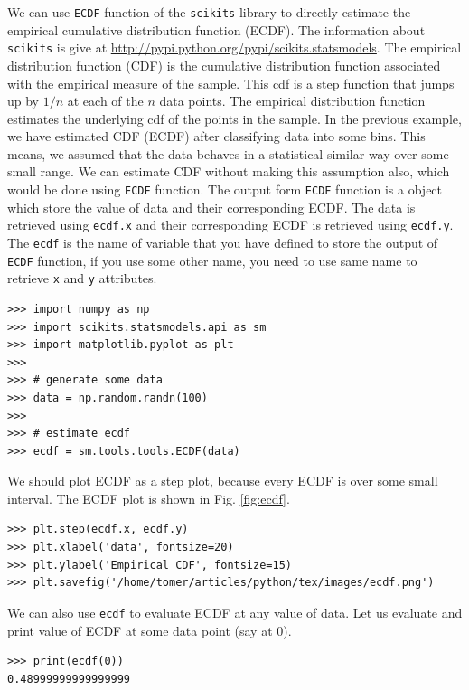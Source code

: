 \documentclass[10pt]{book}
\begin{document}
{We can use \verb"ECDF" function of the \verb"scikits" library to directly estimate the empirical cumulative distribution function (ECDF). The information about \verb"scikits" is give at \url{http://pypi.python.org/pypi/scikits.statsmodels}. The empirical distribution function (CDF) is the cumulative distribution function associated with the empirical measure of the sample. This cdf is a step function that jumps up by $1/n$ at each of the $n$ data points. The empirical distribution function estimates the underlying cdf of the points in the sample. In the previous example, we have estimated CDF (ECDF) after classifying data into some bins. This means, we assumed that the data behaves in a statistical similar way over some small range. We can estimate CDF without making this assumption also, which would be done using \verb"ECDF" function. The output form \verb"ECDF" function is a object which store the value of data and their corresponding ECDF. The data is retrieved using \verb"ecdf.x" and their corresponding 
ECDF is retrieved using \verb"ecdf.y". The \verb"ecdf" is the name of variable that you have defined to store the output of \verb"ECDF" function, if you use some other name, you need to use same name to retrieve \verb"x" and \verb"y" attributes. 
\beforeverb \begin{verbatim}
>>> import numpy as np
>>> import scikits.statsmodels.api as sm
>>> import matplotlib.pyplot as plt
>>> 
>>> # generate some data
>>> data = np.random.randn(100)
>>> 
>>> # estimate ecdf
>>> ecdf = sm.tools.tools.ECDF(data)
\end{verbatim} \afterverb

We should plot ECDF as a step plot, because every ECDF is over some small interval. The ECDF plot is shown in Fig. \ref{fig:ecdf}. 
\beforeverb \begin{verbatim}
>>> plt.step(ecdf.x, ecdf.y)
>>> plt.xlabel('data', fontsize=20)
>>> plt.ylabel('Empirical CDF', fontsize=15)
>>> plt.savefig('/home/tomer/articles/python/tex/images/ecdf.png')
\end{verbatim} \afterverb

We can also use \verb"ecdf" to evaluate ECDF at any value of data. Let us evaluate and print value of ECDF at some data point (say at 0).
\beforeverb \begin{verbatim}
>>> print(ecdf(0))
0.48999999999999999
\end{verbatim} \afterverb

}
\end{document}
